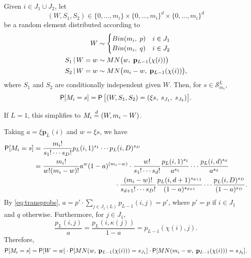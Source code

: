 \documentclass[11pt,draft]{article}
\newcommand{\Ssp}{\mathcal{S}}
\newcommand{\pv}{\mathbf{p}}
\begin{document}
\begin{lem}
Given $i \in J_1 \cup J_2$, let
\[ (W, S_1, S_2) \in \{0,\dots,m_i\} \times \{0,\dots,m_i\}^d \times
\{0,\dots,m_i\}^d \]
be a random element distributed according to
\begin{align}
W &\sim \begin{cases} Bin(m_i,\; p) & i \in J_1 \\
Bin(m_i,\; q) & i \in J_2 \end{cases} \nonumber \\
S_1 \given W = w &\sim MN\big(w,\; \pv_{L-1}(\chi(i))\big) \label{eq:mndecomp}\\
S_2 \given W = w &\sim MN\big(m_i - w,\; \pv_{L-1}(\chi(i))\big), \nonumber
\end{align}
where $S_1$ and $S_2$ are conditionally independent given $W$.
Then, for $s \in \Ssp_{m_i}^L$,
\[ \P[M_i = s] = \P\big[(W, S_1, S_2) = (\xi s,\; s_{J_1},\; s_{J_2})
\big]. \]
\end{lem}
If $L=1$, this simplifies to $M_i \eqdist (W, m_i - W)$.
\begin{pf}
Taking $a = \xi \pv_L(i)$ and $w = \xi s$, we have
\begin{align*}
\P[M_i = s] &= \frac{m_i!}{s_1!\cdots s_D!} p_L(i,1)^{s_1} \cdots
p_L(i,D)^{s_D} \\
&= \frac{m_i!}{w! (m_i - w)!} a^w (1 - a)^{(m_i - w)} \cdot
\frac{w!}{s_1!\cdots s_d!} \frac{p_L(i,1)^{s_1}}{a^{s_1}}\cdots
\frac{p_L(i, d)^{s_d}}{a^{s_d}} \\
&\hspace{12em}\cdot
\frac{(m_i - w)!}{s_{d+1}!\cdots s_D!}
\frac{p_L(i,d + 1)^{s_{d + 1}}}{(1 - a)^{s_{d+1}}}\cdots
\frac{p_L(i,D)^{s_D}}{(1 - a)^{s_D}}.
\end{align*}
By \eqref{eq:transprobs}, $a = p'\cdot\sum_{j \in J_1(L)} p_{L-1}(i, j) = p'$,
where $p' = p$ if $i \in J_1$ and $q$ otherwise.
Furthermore, for $j\in J_1$,
\[ \frac{p_L(i,j)}{a} = \frac{p_L(i,\kappa(j))}{1-a} = p_{L-1}(\chi(i), j). \]
Therefore,
\begin{equation*}
\P[M_i = s] = \P[W = w]\cdot \P[MN(w,\; \pv_{L-1}(\chi(i))) = s_{J_1}]\cdot
\P[MN(m_i - w,\; \pv_{L-1}(\chi(i))) = s_{J_2}].
\end{equation*}
\end{pf}
\end{document}
